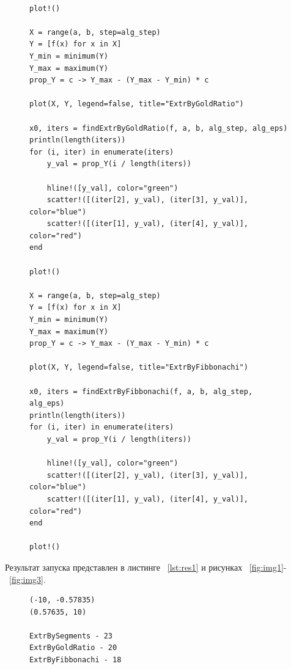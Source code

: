\documentclass[a4paper, 14pt]{extarticle}
\begin{document}
\begin{figure}[!htb]
\begin{lstlisting}[language={},caption={Нахождение минимумов функции},label={lst:code4}]

plot!()

X = range(a, b, step=alg_step)
Y = [f(x) for x in X]
Y_min = minimum(Y)
Y_max = maximum(Y)
prop_Y = c -> Y_max - (Y_max - Y_min) * c

plot(X, Y, legend=false, title="ExtrByGoldRatio")

x0, iters = findExtrByGoldRatio(f, a, b, alg_step, alg_eps)
println(length(iters))
for (i, iter) in enumerate(iters)
    y_val = prop_Y(i / length(iters))

    hline!([y_val], color="green")
    scatter!([(iter[2], y_val), (iter[3], y_val)], color="blue")
    scatter!([(iter[1], y_val), (iter[4], y_val)], color="red")
end

plot!()

X = range(a, b, step=alg_step)
Y = [f(x) for x in X]
Y_min = minimum(Y)
Y_max = maximum(Y)
prop_Y = c -> Y_max - (Y_max - Y_min) * c

plot(X, Y, legend=false, title="ExtrByFibbonachi")

x0, iters = findExtrByFibbonachi(f, a, b, alg_step, alg_eps)
println(length(iters))
for (i, iter) in enumerate(iters)
    y_val = prop_Y(i / length(iters))

    hline!([y_val], color="green")
    scatter!([(iter[2], y_val), (iter[3], y_val)], color="blue")
    scatter!([(iter[1], y_val), (iter[4], y_val)], color="red")
end

plot!()
\end{lstlisting}
\end{figure}

Результат запуска представлен в листинге ~\ref{lst:res1} и рисунках ~\ref{fig:img1}-~\ref{fig:img3}.

\begin{figure}[!htb]
\begin{lstlisting}[language={},caption={Нахождение минимумов функции},label={lst:res1}]
(-10, -0.57835)
(0.57635, 10)

ExtrBySegments - 23
ExtrByGoldRatio - 20
ExtrByFibbonachi - 18
\end{lstlisting}
\end{figure}
\end{document}
